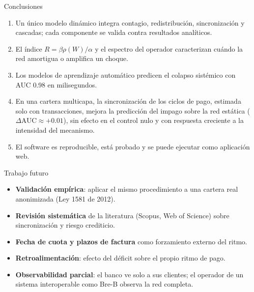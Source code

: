 \documentclass[aspectratio=169,10pt]{beamer}
\begin{document}
\begin{frame}{Conclusiones}
\begin{enumerate}
\item Un único modelo dinámico integra contagio, redistribución, sincronización y
cascadas; cada componente se valida contra resultados analíticos.
\item El índice $R=\beta\rho(W)/\alpha$ y el espectro del operador caracterizan cuándo
la red amortigua o amplifica un choque.
\item Los modelos de aprendizaje automático predicen el colapso sistémico con AUC 0.98
en milisegundos.
\item En una cartera multicapa, la sincronización de los ciclos de pago, estimada solo
con transacciones, mejora la predicción del impago sobre la red estática
($\Delta\mathrm{AUC}\approx+0.01$), sin efecto en el control nulo y con respuesta
creciente a la intensidad del mecanismo.
\item El software es reproducible, está probado y se puede ejecutar como aplicación web.
\end{enumerate}
\end{frame}

\begin{frame}{Trabajo futuro}
\begin{itemize}
\item \textbf{Validación empírica}: aplicar el mismo procedimiento a una cartera real
anonimizada (Ley 1581 de 2012).
\item \textbf{Revisión sistemática} de la literatura (Scopus, Web of Science) sobre
sincronización y riesgo crediticio.
\item \textbf{Fecha de cuota y plazos de factura} como forzamiento externo del ritmo.
\item \textbf{Retroalimentación}: efecto del déficit sobre el propio ritmo de pago.
\item \textbf{Observabilidad parcial}: el banco ve solo a sus clientes; el operador de
un sistema interoperable como Bre-B observa la red completa.
\end{itemize}
\end{frame}
\end{document}
